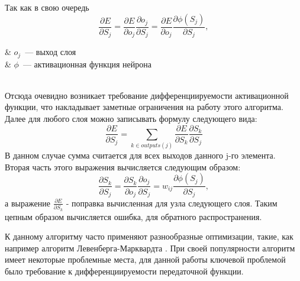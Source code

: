 \documentclass[utf8,usehyperref,14pt]{G7-32}
\begin{document}
Так как в свою очередь 
\begin{equation}
\frac{\partial E}{\partial S_{j}} = \frac{\partial E}{\partial o_{j}}\frac{\partial o_{j}}{\partial S_{j}} = \frac{\partial E}{\partial o_{j}}\frac{\partial \phi(S_{j})}{\partial S_{j}}, 
\end{equation}
  \begin{eqrem}
   & $ o_{j} $~--- выход слоя \\
   & $ \phi $~--- активационная функция нейрона \\
  \end{eqrem} \\
Отсюда очевидно возникает требование дифференциируемости активационной функции, что накладывает заметные ограничения на работу этого алгоритма.
Далее для любого слоя можно записывать формулу следующего вида:
\begin{equation}
\frac{\partial E}{\partial S_{j}} = \sum_{k \in outputs(j)}\frac{\partial E}{\partial S_{k}}\frac{\partial S_{k}}{\partial S_{j}}
\end{equation}
В данном случае сумма считается для всех выходов данного j-го элемента.
Вторая часть этого выражения вычисляется следующим образом:
\begin{equation}
\frac{\partial S_{k}}{\partial S_{j}} = \frac{\partial S_{k}}{\partial o_{j}}\frac{\partial o_{j}}{\partial S_{j}} = w_{ij}\frac{\partial \phi(S_{j})}{\partial S_{j}}, 
\end{equation}
а выражение $ \frac{\partial E}{\partial S_{k}} $ - поправка вычисленная для узла следующего слоя. Таким цепным образом вычисляется ошибка, для обратного распространения.

К данному алгоритму часто применяют разнообразные оптимизации, такие, как например алгоритм Левенберга-Марквардта \cite{LM}. При своей популярности алгоритм имеет некоторые проблемные места, для данной работы ключевой проблемой было требование к дифференциируемости передаточной функции.
\end{document}
